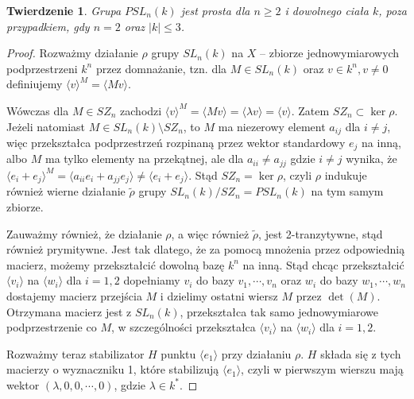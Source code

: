 \documentclass[licencjacka]{pracamgr}
\newtheorem{thh}{Twierdzenie}[section]
\begin{document}
\begin{thh}\label{PSL_simplicy}
  Grupa $PSL_n(k)$ jest prosta dla $n \ge 2$ i dowolnego ciała $k$, poza przypadkiem, gdy $n = 2$ oraz $|k| \le 3$.
\end{thh}
\begin{proof}
  Rozważmy działanie $\rho$ grupy $SL_n(k)$ na $X$ -- zbiorze jednowymiarowych podprzestrzeni $k^n$ przez domnażanie,
  tzn. dla $M \in SL_n(k)$ oraz $v \in k^n, v \ne 0$ definiujemy $\langle v \rangle ^ M = \langle Mv \rangle$.
  
  Wówczas dla $M \in SZ_n$ zachodzi $\langle v \rangle ^ M = \langle M v \rangle = \langle \lambda v \rangle = \langle v \rangle$.
  Zatem $SZ_n \subset \ker \rho$. Jeżeli natomiast $M \in SL_n(k) \setminus SZ_n$, to $M$ ma niezerowy element $a_{i j}$ dla $i \ne j$, 
  więc przekształca podprzestrzeń rozpinaną przez wektor standardowy $e_j$ na inną, albo $M$ ma tylko elementy na przekątnej, 
  ale dla $a_{i i} \ne a_{j j}$ gdzie $i \ne j$ wynika, że $\langle e_i + e_j \rangle^M = \langle a_{i i} e_i + a_{j j} e_j \rangle \ne \langle  e_i + e_j \rangle$.
  Stąd $SZ_n = \ker \rho$, czyli $\rho$ indukuje również wierne działanie $\tilde{\rho}$ grupy $SL_n(k) / SZ_n = PSL_n(k)$ na tym samym zbiorze.

  Zauważmy również, że działanie $\rho$, a więc również $\tilde{\rho}$, jest 2-tranzytywne, stąd również prymitywne.
  Jest tak dlatego, że za pomocą mnożenia przez odpowiednią macierz, możemy przekształcić dowolną bazę $k^n$ na inną.
  Stąd chcąc przekształcić $\langle v_i \rangle$ na $\langle w_i \rangle$ dla $i = 1, 2$ dopełniamy $v_i$ do bazy $v_1, \cdots, v_n$
  oraz $w_i$ do bazy $w_1, \cdots, w_n$ dostajemy macierz przejścia $M$ i dzielimy ostatni wiersz $M$ przez $\det(M)$.
  Otrzymana macierz jest z $SL_n(k)$, przekształca tak samo jednowymiarowe podprzestrzenie co $M$, w szczególności przekształca 
  $\langle v_i \rangle$ na $\langle w_i \rangle$ dla $i = 1, 2$.

  Rozważmy teraz stabilizator $H$ punktu $\langle e_1 \rangle$ przy działaniu $\rho$.
  $H$ składa się z tych macierzy o wyznaczniku 1, które stabilizują $\langle e_1 \rangle$,
  czyli w pierwszym wierszu mają wektor $(\lambda, 0, 0, \cdots, 0)$, gdzie $\lambda \in k^*$.


\end{proof}
\end{document}
